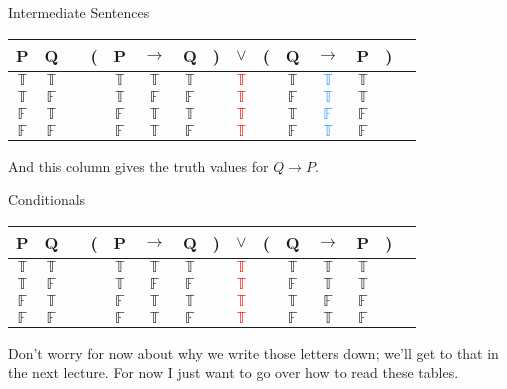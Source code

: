 \documentclass[
  ignorenonframetext,
]{beamer}
\renewcommand{\,}{\text{, }}
\def\True{\mathbb{T}}
\def\False{\mathbb{F}}
\begin{document}
\begin{frame}{Intermediate Sentences}
\protect\hypertarget{intermediate-sentences-2}{}
\begin{center}
\begin{tabular}{@{ }c@{ }@{ }c | c@{ }@{}c@{}@{ }c@{ }@{ }c@{ }@{ }c@{ }@{}c@{}@{ }c@{ }@{}c@{}@{ }c@{ }@{ }c@{ }@{ }c@{ }@{}c@{}@{ }c}
P & Q &  & ( & P & $\rightarrow$ & Q & ) & $\lor$ & ( & Q & $\rightarrow$ & P & ) & \\
\hline 
$\True$ & $\True$ &  &  & $\True$ & $\True$ & $\True$ &  & \textcolor{red}{$\True$} &  & $\True$ & \textcolor{dodgerblue}{$\True$} & $\True$ &  & \\
$\True$ & $\False$ &  &  & $\True$ & $\False$ & $\False$ &  & \textcolor{red}{$\True$} &  & $\False$ & \textcolor{dodgerblue}{$\True$} & $\True$ &  & \\
$\False$ & $\True$ &  &  & $\False$ & $\True$ & $\True$ &  & \textcolor{red}{$\True$} &  & $\True$ & \textcolor{dodgerblue}{$\False$} & $\False$ &  & \\
$\False$ & $\False$ &  &  & $\False$ & $\True$ & $\False$ &  & \textcolor{red}{$\True$} &  & $\False$ & \textcolor{dodgerblue}{$\True$} & $\False$ &  & \\
\end{tabular}

\end{center}

And this column gives the truth values for \(Q \rightarrow P\).
\end{frame}

\begin{frame}{Conditionals}
\protect\hypertarget{conditionals}{}
\begin{center}
\begin{tabular}{@{ }c@{ }@{ }c | c@{ }@{}c@{}@{ }c@{ }@{ }c@{ }@{ }c@{ }@{}c@{}@{ }c@{ }@{}c@{}@{ }c@{ }@{ }c@{ }@{ }c@{ }@{}c@{}@{ }c}
P & Q &  & ( & P & $\rightarrow$ & Q & ) & $\lor$ & ( & Q & $\rightarrow$ & P & ) & \\
\hline 
$\True$ & $\True$ &  &  & $\True$ & $\True$ & $\True$ &  & \textcolor{red}{$\True$} &  & $\True$ & $\True$ & $\True$ &  & \\
$\True$ & $\False$ &  &  & $\True$ & $\False$ & $\False$ &  & \textcolor{red}{$\True$} &  & $\False$ & $\True$ & $\True$ &  & \\
$\False$ & $\True$ &  &  & $\False$ & $\True$ & $\True$ &  & \textcolor{red}{$\True$} &  & $\True$ & $\False$ & $\False$ &  & \\
$\False$ & $\False$ &  &  & $\False$ & $\True$ & $\False$ &  & \textcolor{red}{$\True$} &  & $\False$ & $\True$ & $\False$ &  & \\
\end{tabular}

\end{center}

Don't worry for now about why we write those letters down; we'll get to
that in the next lecture. For now I just want to go over how to read
these tables.
\end{frame}
\end{document}
